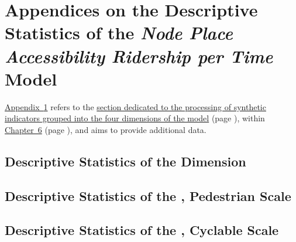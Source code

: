     \setcounter{section}{0}
\chapter{Appendices on the Descriptive Statistics of the \textsl{Node Place Accessibility Ridership per Time} Model}
    \label{annexes:npart}

\hyperref[annexes:npart]{Appendix~\ref{annexes:npart}} refers to the \hyperref[chap6:selection-indicateurs]{section dedicated to the processing of synthetic indicators grouped into the four dimensions of the model} (page \pageref{chap6:selection-indicateurs}), within \hyperref[chap6:titre]{Chapter~6} (page \pageref{chap6:titre}), and aims to provide additional data.%

    \setcounter{tocdepth}{2}
    \renewcommand{\localcontentsname}{Structure of Appendix~\ref{annexes:npart}}
\localtableofcontents

    \newpage
\section{Descriptive Statistics of the  Dimension}
    \label{annexes:npart-node}


\section{Descriptive Statistics of the , Pedestrian Scale}
    \label{annexes:npart-place-pi}


\section{Descriptive Statistics of the , Cyclable Scale}
    \label{annexes:npart-place-ci}

